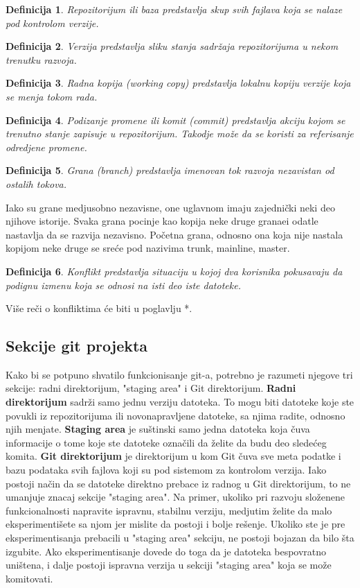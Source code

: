 \documentclass[a4paper]{article}
\newtheorem{definicija}{Definicija}[section]
\begin{document}
{\begin{definicija}
Repozitorijum ili baza predstavlja skup svih fajlava koja se nalaze pod kontrolom verzije.
\end{definicija}

\begin{definicija}
Verzija predstavlja sliku stanja sadržaja repozitorijuma u nekom trenutku razvoja.
\end{definicija}

\begin{definicija}
Radna kopija (working copy) predstavlja lokalnu kopiju verzije koja se menja tokom rada.
\end{definicija}

\begin{definicija}
Podizanje promene ili komit (commit) predstavlja akciju kojom se trenutno stanje zapisuje u repozitorijum. Takodje može da se koristi za referisanje odredjene promene.
\end{definicija}

\begin{definicija}
Grana (branch) predstavlja imenovan tok razvoja nezavistan od ostalih tokova.
\end{definicija}
Iako su grane medjusobno nezavisne, one uglavnom imaju zajednički neki deo njihove istorije. Svaka grana pocinje kao kopija neke druge granaei odatle nastavlja da se razvija nezavisno. Početna grana, odnosno ona koja nije nastala kopijom neke druge se sreće pod nazivima trunk, mainline, master.

\begin{definicija}
Konflikt predstavlja situaciju u kojoj dva korisnika pokusavaju da podignu izmenu koja se odnosi na isti deo iste datoteke.
\end{definicija}
Više reči o konfliktima će biti u poglavlju *.


\subsection{Sekcije git projekta}
\label{subsec:sekcije}
Kako bi se potpuno shvatilo funkcionisanje git-a, potrebno je razumeti njegove tri sekcije: radni direktorijum, "staging area" i Git direktorijum. \textbf{Radni direktorijum} sadrži samo jednu verziju datoteka. To mogu biti datoteke koje ste povukli iz repozitorijuma ili novonapravljene datoteke, sa njima radite, odnosno njih menjate. \textbf{Staging area} je suštinski samo jedna datoteka koja čuva informacije o tome koje ste datoteke označili da želite da budu deo sledećeg komita. \textbf{Git direktorijum} je direktorijum u kom Git čuva sve meta podatke i bazu podataka svih fajlova koji su pod sistemom za kontrolom verzija. Iako postoji način da se datoteke direktno prebace iz radnog u Git direktorijum, to ne umanjuje znacaj sekcije "staging area". Na primer, ukoliko pri razvoju složenene funkcionalnosti napravite ispravnu, stabilnu verziju, medjutim želite da malo eksperimentišete sa njom jer mislite da postoji i bolje rešenje. Ukoliko ste je pre eksperimentisanja prebacili u "staging area" sekciju, ne postoji bojazan da bilo šta izgubite. Ako eksperimentisanje dovede do toga da je datoteka bespovratno uništena, i dalje postoji ispravna verzija u sekciji "staging area" koja se može komitovati.


}
\end{document}
